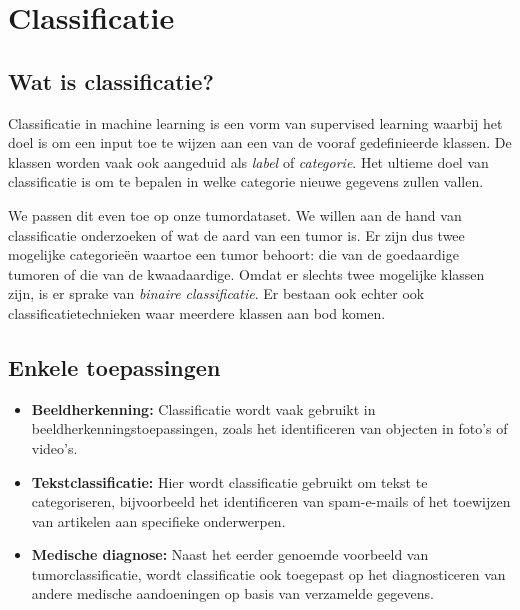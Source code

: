 \documentclass[TeamE-eindrapport]{subfiles}
\begin{document}
	
	\chapter{Classificatie}
	
	\label{tekst:classificatie}
	
	\section{Wat is classificatie?}
	
	Classificatie in machine learning is een vorm van supervised learning waarbij het doel is om een input toe te wijzen aan een van de vooraf gedefinieerde klassen. De klassen worden vaak ook aangeduid als \textit{label} of \textit{categorie}. Het ultieme doel van classificatie is om te bepalen in welke categorie nieuwe gegevens zullen vallen.
	
	We passen dit even toe op onze tumordataset. We willen aan de hand van classificatie onderzoeken of wat de aard van een tumor is. Er zijn dus twee mogelijke categorieën waartoe een tumor behoort: die van de goedaardige tumoren of die van de kwaadaardige. Omdat er slechts twee mogelijke klassen zijn, is er sprake van \textit{binaire classificatie}. Er bestaan ook echter ook classificatietechnieken waar meerdere klassen aan bod komen.
	
	\section{Enkele toepassingen}
	\begin{itemize}
		\item \textbf{Beeldherkenning:} Classificatie wordt vaak gebruikt in beeldherkenningstoepassingen, zoals het identificeren van objecten in foto's of video's.
		
		\item \textbf{Tekstclassificatie:} Hier wordt classificatie gebruikt om tekst te categoriseren, bijvoorbeeld het identificeren van spam-e-mails of het toewijzen van artikelen aan specifieke onderwerpen.
		
		\item \textbf{Medische diagnose:} Naast het eerder genoemde voorbeeld van tumorclassificatie, wordt classificatie ook toegepast op het diagnosticeren van andere medische aandoeningen op basis van verzamelde gegevens.
	\end{itemize}
	
\end{document}

